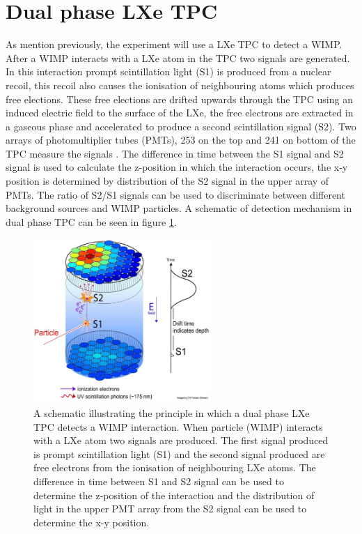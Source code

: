 \section{Dual phase LXe TPC}\label{sec:TPC}
As mention previously, the experiment will use a LXe TPC to detect a WIMP. After a WIMP interacts with a LXe atom in the TPC two signals are generated. In this interaction prompt scintillation light (S1) is produced from a nuclear recoil, this recoil also causes the ionisation of neighbouring atoms which produces free elections. These free elections are drifted upwards through the TPC using an induced electric field to the surface of the LXe, the free electrons are extracted in a gaseous phase and accelerated to produce a second scintillation signal (S2). Two arrays of photomultiplier tubes (PMTs), 253 on the top and 241 on bottom of the TPC measure the signals \cite{LZTDR}. The difference in time between the S1 signal and S2 signal is used to calculate the z-position in which the interaction occurs, the x-y position is determined by distribution of the S2 signal in the upper array of PMTs. The ratio of S2/S1 signals can be used to discriminate between different background sources and WIMP particles. A schematic of detection mechanism in dual phase TPC can be seen in figure \ref{fig:TPC_mech}. 

\begin{figure}[h]
    \centering
    \includegraphics[width=0.6\textwidth]{Figures/TPC_mechanism.jpg}
    \caption{A schematic illustrating the principle in which a dual phase LXe TPC detects a WIMP interaction. When particle (WIMP) interacts with a LXe atom two signals are produced. The first signal produced is prompt scintillation light (S1) and the second signal produced are free electrons from the ionisation of neighbouring LXe atoms. The difference in time between S1 and S2 signal can be used to determine the z-position of the interaction and the distribution of light in the upper PMT array from the S2 signal can be used to determine the x-y position.  \cite{DMUCL}}
    \label{fig:TPC_mech}
\end{figure}

